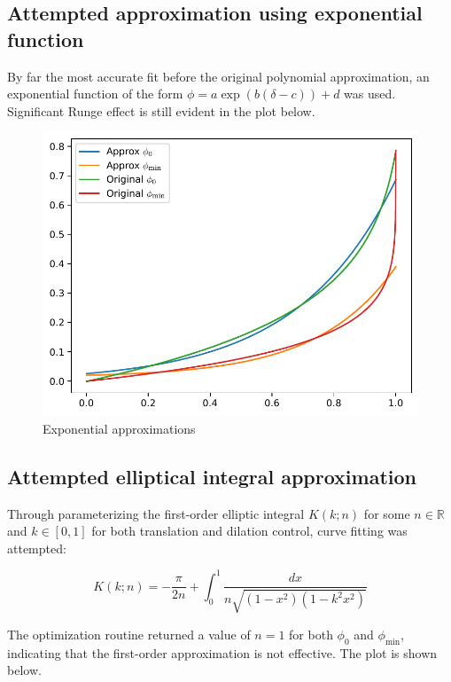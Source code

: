 \subsection{Attempted approximation using exponential function}

By far the most accurate fit before the original polynomial approximation, an exponential function of the form $\phi=a\exp(b(\delta-c))+d$ was used.
Significant Runge effect is still evident in the plot below.

\begin{figure}[H]
    \centering
    \includegraphics[scale=0.75]{plots/exponential-approx.pdf}
    \caption{Exponential approximations}
\end{figure}

\subsection{Attempted elliptical integral approximation}

Through parameterizing the first-order elliptic integral $K(k;n)$ for some $n\in \mathbb{R}$ and $k\in[0,1]$ for both translation and dilation control, curve fitting was attempted:

\begin{equation}
    K(k;n)=-\frac{\pi}{2n}+\int_0^1 \frac{dx}{n\sqrt{(1-x^2)(1-k^2x^2)}}
\end{equation}

The optimization routine returned a value of $n=1$ for both $\phi_0$ and $\phi_\mathrm{min}$, indicating that the first-order approximation is not effective. The plot is shown below.


